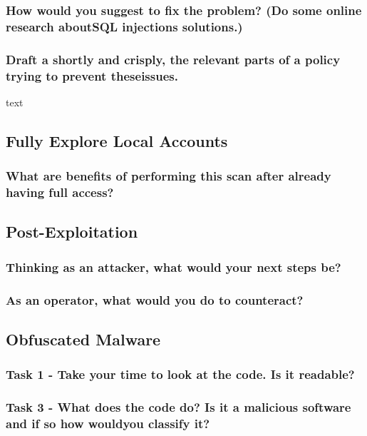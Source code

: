 \subsubsection{How would you suggest to fix the problem? (Do some online research aboutSQL injections solutions.)}
\subsubsection{Draft a shortly and crisply, the relevant parts of a policy trying to prevent theseissues.}
text

\subsection{Fully Explore Local Accounts}
\subsubsection{What are benefits of performing this scan after already having full access?}


\subsection{Post-Exploitation}
\subsubsection{Thinking as an attacker, what would your next steps be?}
\subsubsection{As an operator, what would you do to counteract?}

\subsection{Obfuscated Malware}
\subsubsection{Task 1 - Take your time to look at the code. Is it readable?}
\subsubsection{Task 3 - What does the code do? Is it a malicious software and if so how wouldyou classify it?}
